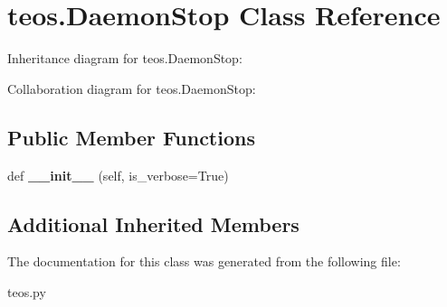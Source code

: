 \hypertarget{classteos_1_1DaemonStop}{}\section{teos.\+Daemon\+Stop Class Reference}
\label{classteos_1_1DaemonStop}


Inheritance diagram for teos.\+Daemon\+Stop\+:


Collaboration diagram for teos.\+Daemon\+Stop\+:
\subsection*{Public Member Functions}
\begin{DoxyCompactItemize}
\item 
\mbox{\label{classteos_1_1DaemonStop_a31f5f271cdf8cfc7aca98785e16e776d}} 
def {\bfseries \+\_\+\+\_\+init\+\_\+\+\_\+} (self, is\+\_\+verbose=True)
\end{DoxyCompactItemize}
\subsection*{Additional Inherited Members}


The documentation for this class was generated from the following file\+:\begin{DoxyCompactItemize}
\item 
teos.\+py\end{DoxyCompactItemize}
